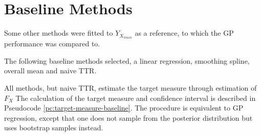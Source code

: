 \section{Baseline Methods}\label{sec:baseline-methods}

Some other methods were fitted to $Y_{X_{train}}$ as a reference, to which
the GP performance was compared to.

The following baseline methods selected, a linear regression, smoothing spline,
overall mean and naive TTR.

All methods, but naive TTR, estimate the target measure through estimation of $F_X$
The calculation of the target measure and confidence interval is described in
Pseudocode \ref{pc:target-measure-baseline}.
The procedure is equivalent to GP regression, except that one does not sample from
the posterior distribution but uses bootstrap samples instead.


